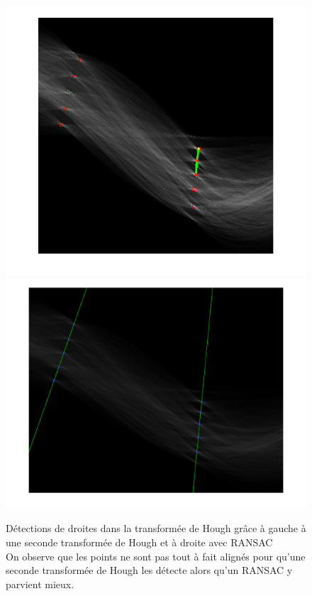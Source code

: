 \begin{figure}[h]
\begin{center}
\includegraphics[scale=0.238]{fig/houghlineshough.png}
\includegraphics[scale=0.2]{fig/houghlinesRANSAC.png}
\caption{\label{houghlines}Détections de droites dans la transformée de Hough grâce à gauche à une seconde transformée de Hough et à droite avec RANSAC \\
On observe que les points ne sont pas tout à fait alignés pour qu'une seconde transformée de Hough les détecte alors qu'un RANSAC y parvient mieux.}
\end{center}
\end{figure}

